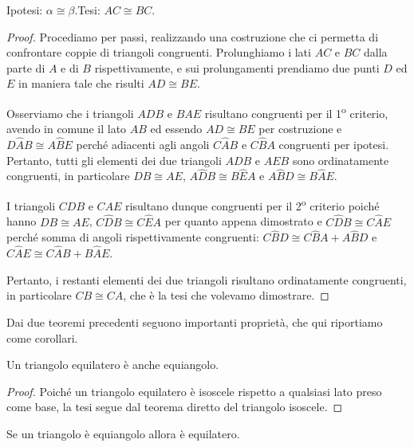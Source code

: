 \begin{figure}[htb]
\centering
\end{figure}

\noindent Ipotesi: $\alpha\cong \beta$.\tab Tesi: $AC\cong BC$.

\begin{proof}
Procediamo per passi, realizzando una costruzione che ci permetta di confrontare coppie di triangoli congruenti. Prolunghiamo i lati $AC$ e $BC$ dalla parte di $A$ e di $B$ rispettivamente, e sui prolungamenti prendiamo due punti $D$ ed $E$ in maniera tale che risulti $AD\cong BE$.

Osserviamo che i triangoli $ADB$ e $BAE$ risultano congruenti per il 1\textsuperscript{o} criterio, avendo in comune il lato $AB$ ed essendo $AD\cong BE$ per costruzione e $D\widehat{A}B\cong A\widehat{B}E$ perché adiacenti agli angoli $C\widehat{A}B$ e $C\widehat{B}A$ congruenti per ipotesi. Pertanto, tutti gli elementi dei due triangoli $ADB$ e $AEB$ sono ordinatamente congruenti, in particolare $DB\cong AE$, $A\widehat{D}B\cong B\widehat{E}A$ e $A\widehat{B}D\cong B\widehat{A}E$.

I triangoli $CDB$ e $CAE$ risultano dunque congruenti per il 2\textsuperscript{o} criterio poiché hanno $DB\cong AE$, $C\widehat{D}B\cong C\widehat{E}A$ per quanto appena dimostrato e $C\widehat{D}B\cong C\widehat{A}E$ perché somma di angoli rispettivamente congruenti: $C\widehat{B}D\cong C\widehat{B}A + A\widehat{B}D$ e $C\widehat{A}E\cong C\widehat{A}B + B\widehat{A}E$.

Pertanto, i restanti elementi dei due triangoli risultano ordinatamente congruenti, in particolare $CB\cong CA$, che è la tesi che volevamo dimostrare.
\end{proof}


Dai due teoremi precedenti seguono importanti proprietà, che qui riportiamo come corollari.

\begin{corollario}
Un triangolo equilatero è anche equiangolo.
\end{corollario}

\begin{proof}
Poiché un triangolo equilatero è isoscele rispetto a qualsiasi lato preso come base, la tesi segue dal teorema diretto del triangolo isoscele.
\end{proof}

\begin{corollario}
Se un triangolo è equiangolo allora è equilatero.
\end{corollario}

